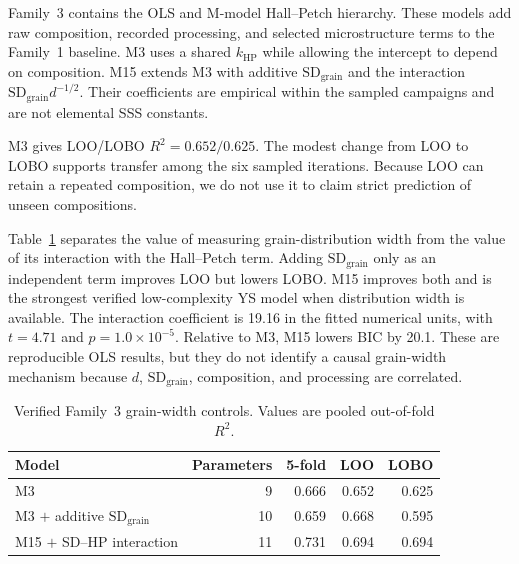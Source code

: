 \documentclass[a4paper,11pt]{article}
\begin{document}
Family~3 contains the OLS and M-model Hall--Petch hierarchy. These models add raw composition, recorded processing, and selected microstructure terms to the Family~1 baseline. M3 uses a shared $k_{\mathrm{HP}}$ while allowing the intercept to depend on composition. M15 extends M3 with additive $\mathrm{SD}_{\mathrm{grain}}$ and the interaction $\mathrm{SD}_{\mathrm{grain}}d^{-1/2}$. Their coefficients are empirical within the sampled campaigns and are not elemental SSS constants.

M3 gives LOO/LOBO $R^2=0.652/0.625$. The modest change from LOO to LOBO supports transfer among the six sampled iterations. Because LOO can retain a repeated composition, we do not use it to claim strict prediction of unseen compositions.

Table~\ref{tab:sdgrain} separates the value of measuring grain-distribution width from the value of its interaction with the Hall--Petch term. Adding $\mathrm{SD}_{\mathrm{grain}}$ only as an independent term improves LOO but lowers LOBO. M15 improves both and is the strongest verified low-complexity YS model when distribution width is available. The interaction coefficient is 19.16 in the fitted numerical units, with $t=4.71$ and $p=1.0\times10^{-5}$. Relative to M3, M15 lowers BIC by 20.1. These are reproducible OLS results, but they do not identify a causal grain-width mechanism because $d$, $\mathrm{SD}_{\mathrm{grain}}$, composition, and processing are correlated.

\begin{table}[H]
\centering
\caption{Verified Family~3 grain-width controls. Values are pooled out-of-fold $R^2$.}
\label{tab:sdgrain}
\small
\begin{tabular}{lrrrr}
\toprule
Model & Parameters & 5-fold & LOO & LOBO \\
\midrule
M3 & 9 & 0.666 & 0.652 & 0.625 \\
M3 $+$ additive $\mathrm{SD}_{\mathrm{grain}}$ & 10 & 0.659 & 0.668 & 0.595 \\
M15 $+$ SD--HP interaction & 11 & 0.731 & 0.694 & 0.694 \\
\bottomrule
\end{tabular}
\end{table}
\end{document}
